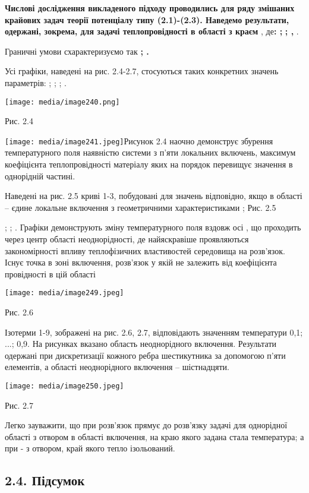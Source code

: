 \textbf{Числові дослідження викладеного підходу проводились для ряду
змішаних крайових задач теорії потенціалу типу (2.1)-(2.3). Наведемо
результати, одержані, зокрема, для задачі теплопровідності в області з
краєм} , де\textbf{: ;} \textbf{; ,} .

Граничні умови схарактеризуємо так \textbf{; .}

Усі графіки, наведені на рис. 2.4-2.7, стосуються таких конкретних
значень параметрів: ; ; ; .

\texttt{[image: media/image240.png]}

Рис. 2.4

\texttt{[image: media/image241.jpeg]}Рисунок
2.4 наочно демонструє збурення температурного поля наявністю системи з
п'яти локальних включень, максимум коефіцієнта теплопровідності
матеріалу яких на порядок перевищує значення в однорідній частині.

Наведені на рис. 2.5 криві 1-3, побудовані для значень відповідно, якщо
в області -- єдине локальне включення з геометричними характеристиками ;
Рис. 2.5

; ; . Графіки демонструють зміну температурного поля вздовж осі , що
проходить через центр області неоднорідності, де найяскравіше
проявляються закономірності впливу теплофізичних властивостей середовища
на розв'язок. Існує точка в зоні включення, розв'язок у якій не залежить
від коефіцієнта провідності в цій області

\texttt{[image: media/image249.jpeg]}

Рис. 2.6

Ізотерми 1-9, зображені на рис. 2.6, 2.7, відповідають значенням
температури 0,1; ...; 0,9. На рисунках вказано область неоднорідного
включення. Результати одержані при дискретизації кожного ребра
шестикутника за допомогою п'яти елементів, а області неоднорідного
включення -- шістнадцяти.

\texttt{[image: media/image250.jpeg]}

Рис. 2.7

Легко зауважити, що при розв'язок прямує до розв'язку задачі для
однорідної області з отвором в області включення, на краю якого задана
стала температура; а при - з отвором, край якого тепло ізольований.

\hypertarget{ux43fux456ux434ux441ux443ux43cux43eux43a}{%
\subsection{2.4.
Підсумок}\label{ux43fux456ux434ux441ux443ux43cux43eux43a}}

